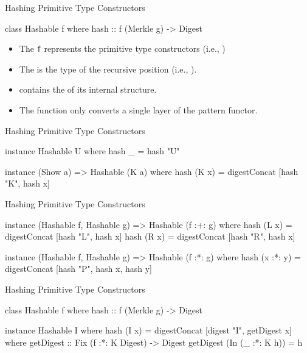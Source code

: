 \begin{slide}{Hashing Primitive Type Constructors}
\begin{haskell}

class Hashable f where
  hash :: f (Merkle g) -> Digest
\end{haskell}

\begin{itemize}
  \item The \texttt{f} represents the primitive type constructors (i.e., ) 
  \item The  is the type of the recursive position (i.e., ). 
  \item {} contains the  of its internal structure.
  \item The  function only converts a single layer of the pattern functor.
\end{itemize}
\end{slide}

\begin{slide}{Hashing Primitive Type Constructors}
\begin{haskell}
instance Hashable U where
  hash _ = hash "U"

instance (Show a) => Hashable (K a) where
  hash (K x) = digestConcat [hash "K", hash x]
\end{haskell}
\end{slide}

\begin{slide}{Hashing Primitive Type Constructors}
\begin{haskell}
instance (Hashable f, Hashable g) => Hashable (f :+: g) where
  hash (L x) = digestConcat [hash "L", hash x]
  hash (R x) = digestConcat [hash "R", hash x]

instance (Hashable f, Hashable g) => Hashable (f :*: g) where
  hash (x :*: y) = digestConcat [hash "P", hash x, hash y]
\end{haskell}
\end{slide}

\begin{slide}{Hashing Primitive Type Constructors}
\begin{haskell}
class Hashable f where
  hash :: f (Merkle g) -> Digest


instance Hashable I where
  hash (I x) = digestConcat [digest "I", getDigest x]
    where
      getDigest :: Fix (f :*: K Digest) -> Digest
      getDigest (In (_ :*: K h)) = h
\end{haskell}
\end{slide}

